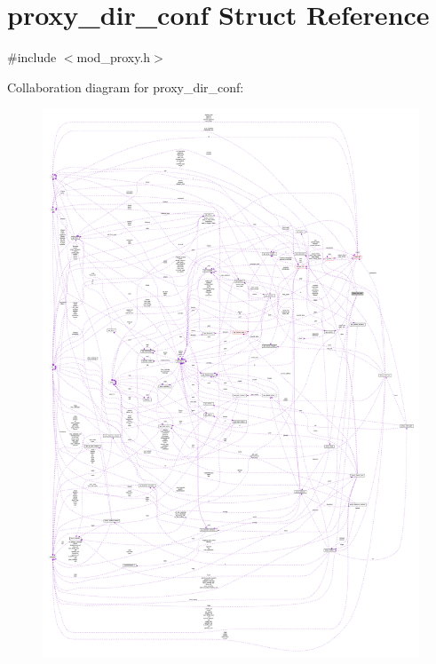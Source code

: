 \hypertarget{structproxy__dir__conf}{}\section{proxy\+\_\+dir\+\_\+conf Struct Reference}
\label{structproxy__dir__conf}


{\ttfamily \#include $<$mod\+\_\+proxy.\+h$>$}



Collaboration diagram for proxy\+\_\+dir\+\_\+conf\+:
\nopagebreak
\begin{figure}[H]
\begin{center}
\leavevmode
\includegraphics[width=350pt]{structproxy__dir__conf__coll__graph}
\end{center}
\end{figure}

